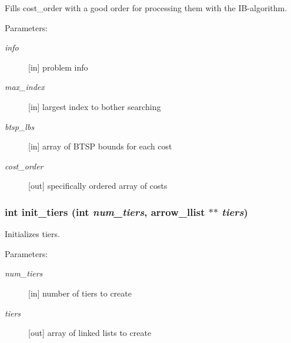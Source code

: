 Fills cost\_\-order with a good order for processing them with the IB-algorithm. 

\begin{Desc}
\item[Parameters:]
\begin{description}
\item[{\em info}]\mbox{[}in\mbox{]} problem info \item[{\em max\_\-index}]\mbox{[}in\mbox{]} largest index to bother searching \item[{\em btsp\_\-lbs}]\mbox{[}in\mbox{]} array of BTSP bounds for each cost \item[{\em cost\_\-order}]\mbox{[}out\mbox{]} specifically ordered array of costs \end{description}
\end{Desc}
\hypertarget{lib_2baltsp_2baltsp-lb_8c_05a2ff158dd6edc613a6623787c04a31}{
\subsubsection[{init\_\-tiers}]{\setlength{\rightskip}{0pt plus 5cm}int init\_\-tiers (int {\em num\_\-tiers}, \/  {\bf arrow\_\-llist} $\ast$$\ast$ {\em tiers})}}
\label{lib_2baltsp_2baltsp-lb_8c_05a2ff158dd6edc613a6623787c04a31}


Initializes tiers. 

\begin{Desc}
\item[Parameters:]
\begin{description}
\item[{\em num\_\-tiers}]\mbox{[}in\mbox{]} number of tiers to create \item[{\em tiers}]\mbox{[}out\mbox{]} array of linked lists to create \end{description}
\end{Desc}
